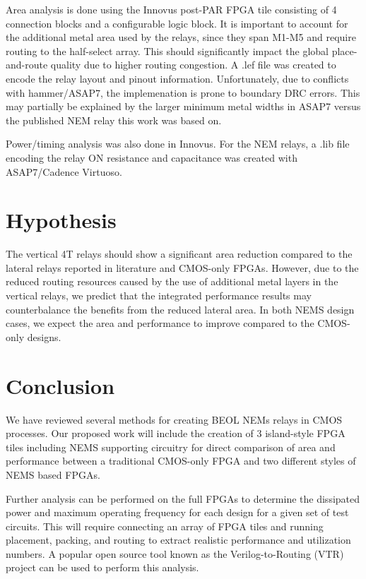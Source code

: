 \documentclass[twoside,twocolumn]{article}
\begin{document}
Area analysis is done using the Innovus post-PAR FPGA tile consisting of 4 connection blocks and a configurable logic block.
It is important to account for the additional metal area used by the relays, since they span M1-M5 and require routing to the half-select array. This should significantly impact the global place-and-route quality due to higher routing congestion. A .lef file was created to encode the relay layout and pinout information. Unfortunately, due to conflicts with hammer/ASAP7, the implemenation is prone to boundary DRC errors. This may partially be explained by the larger minimum metal widths in ASAP7 versus the published NEM relay this work was based on.

Power/timing analysis was also done in Innovus. For the NEM relays, a .lib file encoding the relay ON resistance and capacitance was created with ASAP7/Cadence Virtuoso.



\section{Hypothesis}
The vertical 4T relays should show a significant area reduction compared to the
lateral relays reported in literature and CMOS-only FPGAs. However, due to the reduced routing resources caused
by the use of additional metal layers in the vertical relays, we predict that the integrated
performance results may counterbalance the benefits from the reduced lateral area. In both NEMS design 
cases, we expect the area and performance to improve compared to the CMOS-only designs.

\section{Conclusion}
We have reviewed several methods for creating BEOL NEMs relays in CMOS processes. 
Our proposed work will include the creation of 3 island-style FPGA tiles including NEMS 
supporting circuitry for direct comparison of area and performance between a traditional 
CMOS-only FPGA and two different styles of NEMS based FPGAs.

 Further analysis can be performed 
on the full FPGAs to determine the dissipated power and maximum 
operating frequency for each design for a given set of test circuits.
This will require connecting an array of FPGA tiles and running 
placement, packing, and routing to extract realistic performance and
utilization numbers. A popular open source tool known as the Verilog-to-Routing 
(VTR) project \cite{vtr8} can be used to perform this analysis.  



\printbibliography

\end{document}
